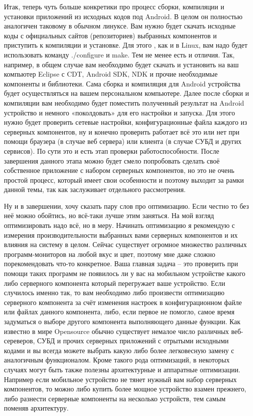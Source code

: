 \documentclass[10pt, a5paper]{article}
\begin{document}
Итак, теперь чуть больше конкретики про процесс сборки, компиляции и установки приложений из исходных кодов под Android. В целом он полностью аналогичен таковому в обычном линуксе. Вам нужно будет скачать исходные коды с официальных сайтов (репозиториев) выбранных компонентов и приступить к компиляции и установке. Для этого , как и в Linux, вам надо будет использовать команду ./configure  и make. Тем не менее есть и отличия. Так, например, в общем случае вам необходимо будет скачать и установить на ваш компьютер Eclipse с CDT, Android SDK, NDK и прочие необходимые компоненты и библиотеки. Сама сборка и компиляция для Android устройства будет осуществляться на вашем персональном компьютере. Далее после сборки и компиляции вам необходимо будет поместить полученный результат на Android устройство и немного «поколдовать» для его настройки и запуска. Для этого нужно будет проверить сетевые настройки, конфигурационные файла каждого из серверных компонентов, ну и конечно проверить работает всё это или нет при помощи браузера (в случае веб сервера) или клиента (в случае СУБД и других сервисов). По сути это и есть этап проверки работоспособности. После завершения данного этапа можно будет смело попробовать сделать своё собственное приложение с набором серверных компонентов, но это не очень простой процесс, который имеет свои особенности и поэтому выходит за рамки данной темы, так как заслуживает отдельного рассмотрения.

Ну и в завершении, хочу сказать пару слов про оптимизацию. Если честно то без неё можно обойтись, но всё-таки лучше этим заняться. На мой взгляд оптимизировать надо всё, но в меру. Начинать оптимизацию я рекомендую с измерения производительности выбранных вами серверных компонентов и их влияния на систему в целом. Сейчас существует огромное множество различных программ-мониторов на любой вкус и цвет, поэтому мне даже сложно порекомендовать что-то конкретное. Ваша главная задача – это проверить при помощи таких программ не появилось ли у вас на мобильном устройстве какого либо серверного компонента который перегружает ваше устройство. Если случилось именно так, то вам необходимо либо произвести оптимизацию серверного компонента за счёт изменения настроек в конфигурационном файле или файлах данного компонента, либо, если первое не помогло, самое время задуматься о выборе другого компонента выполняющего данные функции. Как известно в мире Opensource обычно существует немалое число различных веб-сереверов, СУБД и прочих серверных приложений с отрытыми исходными кодами и вы всегда можете выбрать какую либо более легковесную замену с аналогичным функционалом. Кроме такого рода оптимизаций, в некоторых случаях могут быть также полезны архитектурные и аппаратные оптимизации. Например если мобильное устройство не тянет нужный вам набор серверных компонентов, то можно либо купить более мощное устройство взамен прежнего, либо разнести серверные компоненты на несколько устройств, тем самым поменяв архитектуру.
\end{document}
